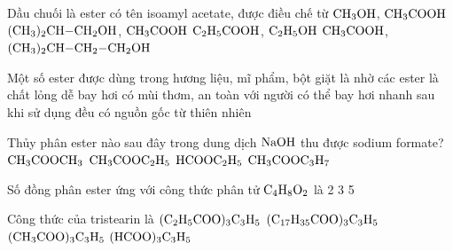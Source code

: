 \documentclass[12pt,a4paper]{article}
\begin{document}
\begin{ex}
Dầu chuối là ester có tên isoamyl acetate, được điều chế từ
\choice
{$\ce{CH3OH}$, $\ce{CH3COOH}$}
{$\ce{(CH3)2CH-CH2OH}$, $\ce{CH3COOH}$}
{$\ce{C2H5COOH}$, $\ce{C2H5OH}$}
{\True $\ce{CH3COOH}$, $\ce{(CH3)2CH-CH2-CH2OH}$}
\end{ex}

\begin{ex}
Một số ester được dùng trong hương liệu, mĩ phẩm, bột giặt là nhờ các ester
\choice
{là chất lỏng dễ bay hơi}
{\True có mùi thơm, an toàn với người}
{có thể bay hơi nhanh sau khi sử dụng}
{đều có nguồn gốc từ thiên nhiên}
\end{ex}

\begin{ex}
Thủy phân ester nào sau đây trong dung dịch $\ce{NaOH}$ thu được sodium formate?
\choice
{$\ce{CH3COOCH3}$}
{$\ce{CH3COOC2H5}$}
{\True $\ce{HCOOC2H5}$}
{$\ce{CH3COOC3H7}$}
\end{ex}

\begin{ex}
Số đồng phân ester ứng với công thức phân tử $\ce{C4H8O2}$ là
\choice
{2}
{3}
{}
{5}
\end{ex}

\begin{ex}
Công thức của tristearin là
\choice
{$\ce{(C2H5COO)3C3H5}$}
{\True $\ce{(C17H35COO)3C3H5}$}
{$\ce{(CH3COO)3C3H5}$}
{$\ce{(HCOO)3C3H5}$}
\end{ex}
\end{document}
